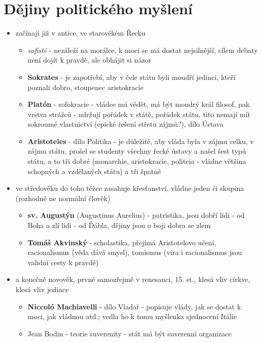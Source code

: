 \documentclass{article}
\begin{document}
\section{Dějiny politického myšlení}
\begin{itemize}
  \item začínají již v antice, ve starověkém Řecku
  \begin{itemize}
    \item \textit{sofisté} - nezáleží na morálce, k moci se má dostat nejsilnější, cílem debaty není dojít k pravdě, ale obhájit si názor
    \item \textbf{Sokrates} - je zapotřebí, aby v čele státu byli moudří jedinci, kteří poznali dobro, stoupenec aristokracie
    \item \textbf{Platón} - sofokracie - vládce má vědět, má být moudrý král filosof, pak vrstva strážců - udržují pořádek v státě, pořádek státu, tito nemají mít sokroumé vlastnictví (epické řešení střetu zájmů?), dílo Ústava
    \item \textbf{Aristoteles} - dílo Politika - je důležité, aby vláda byla v zájmu celku, v zájmu státu, prošel se studenty všechny řecké ústavy a našel šest typů státu, a to tři dobré (monarchie, aristokracie, politeia - vládne většina schopných a vzdělaných státu) a tři špatné
  \end{itemize}
  \item ve středověku do toho těžce zasahuje křesťanství, vládne jeden či skupina (rozhodně ne normální člověk)
  \begin{itemize}
    \item \textbf{sv. Augustýn} (Augustinus Aurelius) - patristika, jsou dobří lidi - od Boha a zlí lidi - od Ďábla, dějiny jsou o boji dobra se zlem
    \item \textbf{Tomáš Akvinský} - scholastika, přejímá Aristotelovo učení, racionalismus (věda dává smysl), tomismus (víra i racionalismus jsou validní cesty k pravdě)
  \end{itemize}
  \item a konečně novověk, prvně samozřejmě v renesanci, 15. st., klesá vliv církve, klesá vliv jedince
  \begin{itemize}
    \item \textbf{Niccoló Machiavelli} - dílo Vladař - popisuje vlády, jak se dostat k moci, jak vládnou atd.; vedla ho k tomu myšlenka sjednocení Itálie
    \item Jean Bodin - teorie suverenity - stát má být suverenní organizace
  \end{itemize}

\end{itemize}
\end{document}
